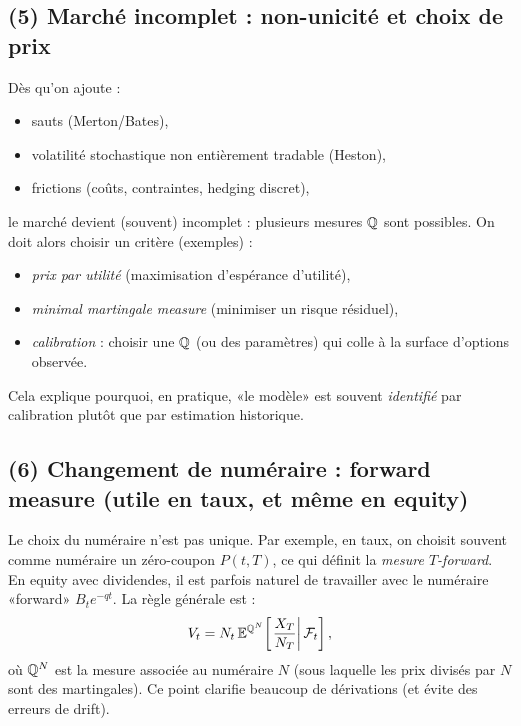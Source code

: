 \subsection*{(5) Marché incomplet : non-unicité et choix de prix}
Dès qu'on ajoute :
\begin{itemize}[leftmargin=*]
\item sauts (Merton/Bates),
\item volatilité stochastique non entièrement tradable (Heston),
\item frictions (coûts, contraintes, hedging discret),
\end{itemize}
le marché devient (souvent) incomplet : plusieurs mesures $\mathbb{Q}$ sont possibles.
On doit alors choisir un critère (exemples) :
\begin{itemize}[leftmargin=*]
\item \emph{prix par utilité} (maximisation d'espérance d'utilité),
\item \emph{minimal martingale measure} (minimiser un risque résiduel),
\item \emph{calibration} : choisir une $\mathbb{Q}$ (ou des paramètres) qui colle à la surface d'options observée.
\end{itemize}
Cela explique pourquoi, en pratique, «le modèle» est souvent \emph{identifié} par calibration plutôt que par estimation historique.

\subsection*{(6) Changement de numéraire : forward measure (utile en taux, et même en equity)}
Le choix du numéraire n'est pas unique.
Par exemple, en taux, on choisit souvent comme numéraire un zéro-coupon $P(t,T)$, ce qui définit la \emph{mesure $T$-forward}.
En equity avec dividendes, il est parfois naturel de travailler avec le numéraire «forward» $B_t e^{-qt}$.
La règle générale est :
\[
V_t = N_t\,\mathbb{E}^{\mathbb{Q}^{N}}\!\left[\left.\frac{X_T}{N_T}\right|\mathcal{F}_t\right],
\]
où $\mathbb{Q}^{N}$ est la mesure associée au numéraire $N$ (sous laquelle les prix divisés par $N$ sont des martingales).
Ce point clarifie beaucoup de dérivations (et évite des erreurs de drift).
